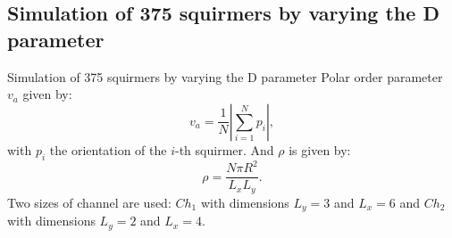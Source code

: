 \documentclass{beamer}
\begin{document}
\subsection{Simulation of 375 squirmers by varying the D parameter}
\begin{frame}{Simulation of 375 squirmers by varying the D parameter}
    Polar order parameter $v_a$ given by\cite{Vicsek}:
    $$v_a = \frac{1}{N}\left|\sum^{N}_{i=1}p_i\right|,$$
    with $p_i$ the orientation of the $i$-th squirmer. And $\rho$ is given by:
$$\rho = \frac{N\pi R^2}{L_xL_y}.$$
    Two sizes of channel are used: $Ch_1$ with dimensions $L_y = 3$ and $L_x = 6$ and $Ch_2$ with dimensions $L_y=2$ and $L_x=4$. 
    \begin{center}
    \end{center}
\end{frame}
\end{document}
